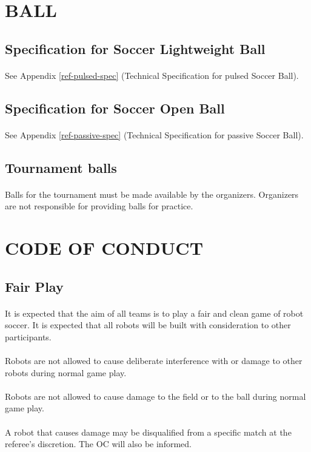 \documentclass{article}
\newcommand*{\p}{\paragraph{}}
\begin{document}
\section{BALL \label{section:ball}}

\subsection{Specification for Soccer Lightweight Ball \label{ref-sec-spec-plused}}

\p See Appendix \ref{ref-pulsed-spec} (Technical Specification for pulsed Soccer
Ball).

\subsection{Specification for Soccer Open Ball\label{ref-sec-spec-open}}

\p See Appendix \ref{ref-passive-spec} (Technical Specification for passive Soccer
Ball).

\subsection{ Tournament balls \label{ref-tournament-balls}}

\p Balls for the tournament must be made available by the organizers. Organizers
are not responsible for providing balls for practice.

\section{CODE OF CONDUCT\label{ref-code-of-conduct}}

\subsection{ Fair Play \label{ref-041}}

\p It is expected that the aim of all teams is to play a fair and clean game of
robot soccer. It is expected that all robots will be built with consideration
to other participants.

\p Robots are not allowed to cause deliberate interference with or damage to other
robots during normal game play.

\p Robots are not allowed to cause damage to the field or to the ball during
normal game play.

\p A robot that causes damage may be disqualified from a specific
match at the referee's discretion. The OC will also be informed.
\end{document}
